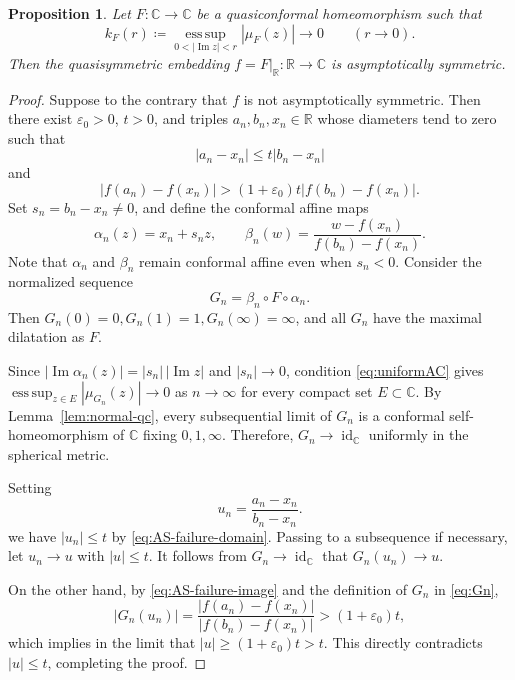 \documentclass[10pt,a4paper]{amsart}
\numberwithin{equation}{section}
\newtheorem{proposition}[theorem]{Proposition}
\newcommand{\R}{\mathbb{R}}
\newcommand{\C}{\mathbb{C}}
\newcommand{\id}{\operatorname{id}}
\newcommand{\esssup}{\operatorname*{ess\,sup}}
\begin{document}
\begin{proposition}\label{prop:AC-boundary-AS}
Let $F\colon\C\to\C$ be a quasiconformal homeomorphism such that
\begin{equation}\label{eq:uniformAC}
 k_F(r)\coloneqq \esssup_{0<|\operatorname{Im}z|<r}|\mu_F(z)|\to 0\qquad(r\to0).
\end{equation}
Then the quasisymmetric embedding $f=F|_{\R}\colon\R\to\C$ is asymptotically symmetric.
\end{proposition}

\begin{proof}
Suppose to the contrary that $f$ is not asymptotically symmetric. Then there exist $\varepsilon_0>0$, $t>0$, and triples $a_n,b_n,x_n\in\R$ whose diameters tend to zero such that
\begin{equation}\label{eq:AS-failure-domain}
 |a_n-x_n|\leq t|b_n-x_n|
\end{equation}
and
\begin{equation}\label{eq:AS-failure-image}
 |f(a_n)-f(x_n)|>(1+\varepsilon_0)t|f(b_n)-f(x_n)|.
\end{equation}
Set $s_n=b_n-x_n\ne0$, and define the conformal affine maps
\[
\alpha_n(z)=x_n+s_nz, \qquad\beta_n(w)= \frac{w-f(x_n)}{f(b_n)-f(x_n)}.
\]
Note that $\alpha_n$ and $\beta_n$ remain conformal affine even when $s_n<0$.  
Consider the normalized sequence
\begin{equation}\label{eq:Gn}
 G_n=\beta_n\circ F\circ\alpha_n.
\end{equation}
Then $G_n(0)=0, G_n(1)=1,G_n(\infty)=\infty$, and all $G_n$ have the maximal dilatation as $F$.

Since $|\operatorname{Im}\alpha_n(z)|=|s_n|\,|\operatorname{Im}z|$ and $|s_n|\to0$, condition \eqref{eq:uniformAC} gives $\esssup_{z\in E}|\mu_{G_n}(z)|\to 0$ as $n \to \infty$ for every compact set $E\subset\C$.
By Lemma~\ref{lem:normal-qc}, every subsequential limit of $G_n$ is a conformal self-homeomorphism of $\C$ fixing $0,1,\infty$.  
Therefore,
$G_n\to \id_{\C}$
uniformly in the spherical metric.

Setting
\[
 u_n=\frac{a_n-x_n}{b_n-x_n}.
\]
we have $|u_n|\leq t$ by \eqref{eq:AS-failure-domain}. 
Passing to a subsequence if necessary, let $u_n\to u$ with $|u|\leq t$.  
It follows from $G_n\to \id_{\C}$ that $G_n(u_n)\to u$.

On the other hand, by \eqref{eq:AS-failure-image} and the definition of $G_n$ in \eqref{eq:Gn},
\[
 |G_n(u_n)|=\frac{|f(a_n)-f(x_n)|}{|f(b_n)-f(x_n)|}>(1+\varepsilon_0)t,
\]
which implies in the limit that $|u| \geq (1+\varepsilon_0)t > t$. This directly contradicts $|u|\leq t$, completing the proof.
\end{proof}
\end{document}
